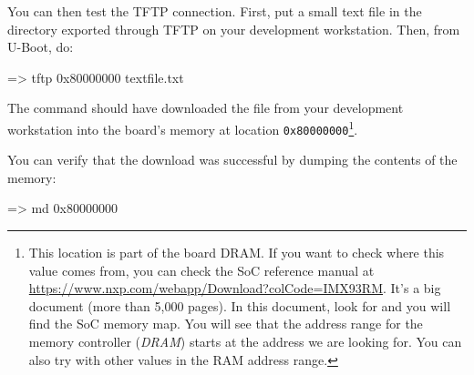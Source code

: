 You can then test the TFTP connection. First, put a small text file in
the directory exported through TFTP on your development
workstation. Then, from U-Boot, do:

\begin{ubootinput}
=> tftp 0x80000000 textfile.txt
\end{ubootinput}

The  command should have downloaded the
 file from your development workstation into
the board's memory at location {\tt 0x80000000}\footnote{
This location is part of the board DRAM. If you want
to check where this value comes from, you can check the SoC
reference manual at
\url{https://www.nxp.com/webapp/Download?colCode=IMX93RM}.
It's a big document (more than 5,000 pages). In this document, look
for  and you will find the SoC memory map.
You will see that the address range for the memory controller
({\em DRAM})
starts at the address we are looking for.
You can also try with other values in the RAM address range.}.

You can verify that the download was successful by dumping the
contents of the memory:

\begin{ubootinput}
=> md 0x80000000
\end{ubootinput}

